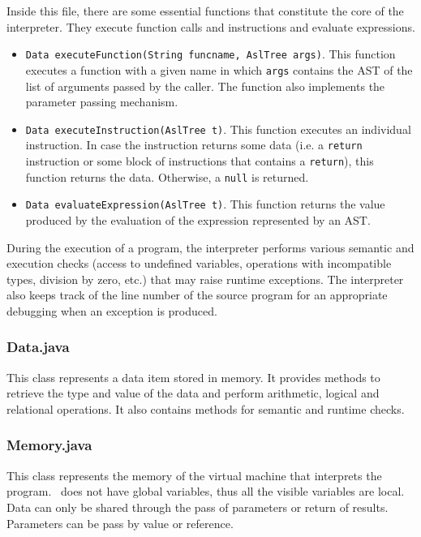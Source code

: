 Inside this file, there are some essential functions that constitute the
core of the interpreter. They execute function calls and instructions and
evaluate expressions.

\begin{itemize}
 \item \texttt{Data executeFunction(String funcname, AslTree args)}. This
function executes a function with a given name in which \texttt{args}
contains the AST of the list of arguments passed by the caller. The function
also implements the parameter passing mechanism.

\item \texttt{Data executeInstruction(AslTree t)}. This function executes
an individual instruction. In case the instruction returns some data (i.e. a
\texttt{return} instruction or some block of instructions that contains a
\texttt{return}), this function returns the data. Otherwise, a \texttt{null}
is returned.

\item \texttt{Data evaluateExpression(AslTree t)}. This function returns the
value produced by the evaluation of the expression represented by an AST.
\end{itemize}

During the execution of a program, the interpreter performs various semantic
and execution checks (access to undefined variables, operations with
incompatible types, division by zero, etc.) that may raise runtime exceptions.
The interpreter also keeps track of the line number of the source program for
an appropriate debugging when an exception is produced.

\subsubsection{Data.java}

This class represents a data item stored in memory. It provides methods to
retrieve the type and value of the data and perform arithmetic, logical and
relational operations. It also contains methods for semantic and runtime
checks.

\subsubsection{Memory.java}

This class represents the memory of the virtual machine that interprets
the program. \asl\ does not have global variables, thus all the visible
variables are local. Data can only be shared through the pass of parameters
or return of results. Parameters can be pass by value or reference.

